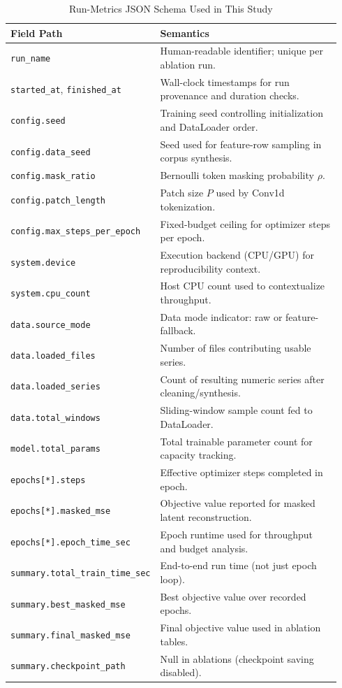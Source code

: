 \documentclass[conference]{IEEEtran}
\begin{document}
\begin{table}[t]
\caption{Run-Metrics JSON Schema Used in This Study}
\label{tab:metrics_schema}
\centering
\scriptsize
\begin{tabular}{p{0.28\linewidth}p{0.66\linewidth}}
\toprule
Field Path & Semantics \\
\midrule
\texttt{run\_name} & Human-readable identifier; unique per ablation run. \\
\texttt{started\_at}, \texttt{finished\_at} & Wall-clock timestamps for run provenance and duration checks. \\
\texttt{config.seed} & Training seed controlling initialization and DataLoader order. \\
\texttt{config.data\_seed} & Seed used for feature-row sampling in corpus synthesis. \\
\texttt{config.mask\_ratio} & Bernoulli token masking probability $\rho$. \\
\texttt{config.patch\_length} & Patch size $P$ used by Conv1d tokenization. \\
\texttt{config.max\_steps\_per\_epoch} & Fixed-budget ceiling for optimizer steps per epoch. \\
\texttt{system.device} & Execution backend (CPU/GPU) for reproducibility context. \\
\texttt{system.cpu\_count} & Host CPU count used to contextualize throughput. \\
\texttt{data.source\_mode} & Data mode indicator: raw or feature-fallback. \\
\texttt{data.loaded\_files} & Number of files contributing usable series. \\
\texttt{data.loaded\_series} & Count of resulting numeric series after cleaning/synthesis. \\
\texttt{data.total\_windows} & Sliding-window sample count fed to DataLoader. \\
\texttt{model.total\_params} & Total trainable parameter count for capacity tracking. \\
\texttt{epochs[*].steps} & Effective optimizer steps completed in epoch. \\
\texttt{epochs[*].masked\_mse} & Objective value reported for masked latent reconstruction. \\
\texttt{epochs[*].epoch\_time\_sec} & Epoch runtime used for throughput and budget analysis. \\
\texttt{summary.total\_train\_time\_sec} & End-to-end run time (not just epoch loop). \\
\texttt{summary.best\_masked\_mse} & Best objective value over recorded epochs. \\
\texttt{summary.final\_masked\_mse} & Final objective value used in ablation tables. \\
\texttt{summary.checkpoint\_path} & Null in ablations (checkpoint saving disabled). \\
\bottomrule
\end{tabular}
\end{table}
\end{document}
